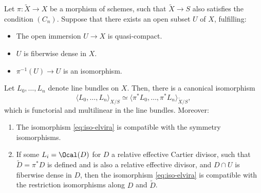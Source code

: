 \begin{proposition}\label{prop:elvira}
Let $\pi \colon \widetilde{X} \to X$ be a morphism of schemes, such that $\widetilde{X} \to S$ also satisfies the condition $(C_n)$. Suppose that there exists an open subset $U$ of $X$, fulfilling:
\begin{itemize}
\item The open immersion $U \to X$ is quasi-compact.
\item $U$ is fiberwise dense in $X$.
\item $\pi^{-1}(U)\to U$ is an isomorphism.
\end{itemize}
Let $L_{0},\ldots, L_{n}$ denote line bundles on $X$. Then, there is a canonical isomorphism
\begin{equation}\label{eq:iso-elvira}
\langle L_0, \ldots, L_n \rangle_{X/S} \simeq \langle \pi^\ast L_0, \ldots, \pi^\ast L_n \rangle_{\widetilde{X}/S},
\end{equation}
which is functorial and multilinear in the line bundles. Moreover:
\begin{enumerate}
\item\label{item:elvira-1} The isomorphism \eqref{eq:iso-elvira} is compatible with the symmetry isomorphisms.
\item\label{item:elvira-3} If some $L_{i}=\Ocal(D)$ for $D$ a relative effective Cartier divisor, such that $\widetilde{D} = \pi^{\ast} D$ is defined and is also a relative effective divisor, and $D\cap U$ is fiberwise dense in $D$, then the isomorphism \eqref{eq:iso-elvira} is compatible with the restriction isomorphisms along $D$ and $\widetilde{D}$.
\end{enumerate}

\end{proposition}
